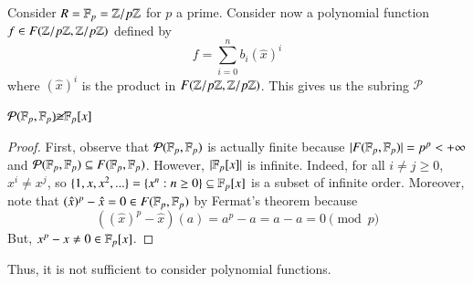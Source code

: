 \documentclass[12pt, a4paper, oneside, openright, titlepage]{book}
\begin{document}
\begin{eg}
    Consider $R = \mathbb F_p = \mathbb Z/p\mathbb Z$ for $p$ a prime. Consider now a polynomial function $f \in F(\mathbb Z/p\mathbb Z,\mathbb Z/p\mathbb Z)$ defined by $$f = \sum\limits_{i=0}^nb_i(\hat{x})^i$$ where $(\hat{x})^i$ is the product in $F(\mathbb Z/p\mathbb Z, \mathbb Z/p\mathbb Z)$. This gives us the subring $\mathcal{P}$
    \begin{claim}
        $\mathcal{P}(\mathbb F_p,\mathbb F_p) \cancel{\cong} \mathbb F_p[x]$
        \begin{proof}
            First, observe that $\mathcal{P}(\mathbb F_p,\mathbb F_p)$ is actually finite because $|F(\mathbb F_p,\mathbb F_p)| = p^p < +\infty$ and $\mathcal{P}(\mathbb F_p,\mathbb F_p) \subseteq F(\mathbb F_p,\mathbb F_p)$. However, $|\mathbb F_p[x]|$ is infinite. Indeed, for all $i \neq j\geq 0$, $x^i \neq x^j$, so $\{1,x,x^2,...\} = \{x^n:n\geq 0\} \subseteq \mathbb F_p[x]$ is a subset of infinite order. Moreover, note that $(\hat{x})^p - \hat{x} = 0 \in F(\mathbb F_p,\mathbb F_p)$ by Fermat's theorem because $$((\hat{x})^p - \hat{x})(a) = a^p-a = a-a = 0 \pmod{p}$$
            But, $x^p - x \neq 0 \in \mathbb F_p[x]$.
        \end{proof}
    \end{claim}
    Thus, it is not sufficient to consider polynomial functions.
\end{eg} 
\end{document}
